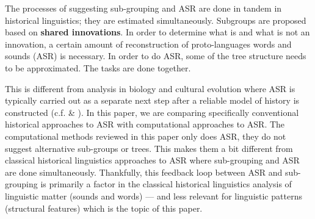 \documentclass[12pt,letterpaper]{article}
\begin{document}
The processes of suggesting sub-grouping and ASR are done in tandem in historical linguistics; they are estimated simultaneously. Subgroups are proposed based on \textbf{shared innovations}. In order to determine what is and what is not an innovation, a certain amount of reconstruction of proto-languages words and sounds (ASR) is necessary. In order to do ASR, some of the tree structure needs to be approximated. The tasks are done together.

This is different from analysis in biology and cultural evolution where ASR is typically carried out as a separate next step after a reliable model of history is constructed (c.f. \citet{holland2020accuracy} \& \citet{evans2021uses}). In this paper, we are comparing specifically conventional historical approaches to ASR with computational approaches to ASR. The computational methods reviewed in this paper only does ASR, they do not suggest alternative sub-groups or trees. This makes them a bit different from classical historical linguistics approaches to ASR where sub-grouping and ASR are done simultaneously. Thankfully, this feedback loop between ASR and sub-grouping is primarily a factor in the classical historical linguistics analysis of linguistic matter (sounds and words) --- and less relevant for linguistic patterns (structural features) which is the topic of this paper.





\end{document}
